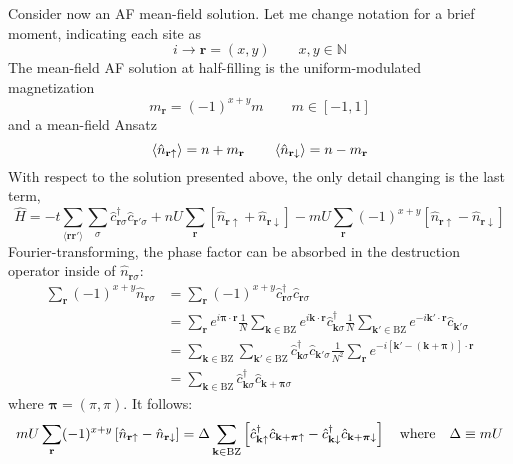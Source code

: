 Consider now an AF mean-field solution. Let me change notation for a brief moment, indicating each site as
\[
	i \to \mathbf{r} = (x,y)
	\qquad
	x,y \in \mathbb{N}
\]
The mean-field AF solution at half-filling is the uniform-modulated magnetization
\[
	m_\mathbf{r} = (-1)^{x+y} m
	\qquad
	m \in [-1,1]
\]
and a mean-field Ansatz
\[
	\ev{\hat n_{\mathbf{r}\uparrow}} = n+m_\mathbf{r}
	\qquad
	\ev{\hat n_{\mathbf{r}\downarrow}} = n-m_\mathbf{r}
\]
With respect to the solution presented above, the only detail changing is the last term,
\begin{equation}\label{appeq:hubbard-mean-field-hamiltonian}
	\hat H = -t \sum_{\langle \mathbf{r}\mathbf{r}' \rangle} \sum_\sigma \hat c_{\mathbf{r}\sigma}^\dagger \hat c_{\mathbf{r}'\sigma}
	+ nU \sum_\mathbf{r} \left[
		\hat n_{\mathbf{r}\uparrow} + \hat n_{\mathbf{r}\downarrow}
	\right] - mU \sum_\mathbf{r} (-1)^{x+y} \left[
		\hat n_{\mathbf{r}\uparrow} - \hat n_{\mathbf{r}\downarrow}
	\right]
\end{equation}
Fourier-transforming, the phase factor can be absorbed in the destruction operator inside of $\hat n_{\mathbf{r}\sigma}$:
\[
\begin{aligned}
	\sum_\mathbf{r} (-1)^{x+y} \hat n_{\mathbf{r}\sigma} &= \sum_\mathbf{r} (-1)^{x+y} \hat c_{\mathbf{r}\sigma}^\dagger \hat c_{\mathbf{r}\sigma} \\
	&= 
	\sum_\mathbf{r} e^{i \bm{\pi} \cdot \mathbf{r}}
	\frac{1}{N} \sum_{\mathbf{k} \in \mathrm{BZ}} e^{i \mathbf{k} \cdot \mathbf{r}} \hat c_{\mathbf{k}\sigma}^\dagger \frac{1}{N} \sum_{\mathbf{k}' \in \mathrm{BZ}} e^{-i \mathbf{k}' \cdot \mathbf{r}} \hat c_{\mathbf{k}'\sigma} \\
	&= \sum_{\mathbf{k} \in \mathrm{BZ}} \sum_{\mathbf{k}' \in \mathrm{BZ}} \hat c_{\mathbf{k}\sigma}^\dagger \hat c_{\mathbf{k}'\sigma} \frac{1}{N^2} \sum_\mathbf{r} e^{-i [\mathbf{k}' - (\mathbf{k} + \bm{\pi}) ] \cdot \mathbf{r}} \\
	&= \sum_{\mathbf{k} \in \mathrm{BZ}} \hat c_{\mathbf{k}\sigma}^\dagger \hat c_{\mathbf{k}+\bm{\pi}\sigma}
\end{aligned}
\]
where $\bm{\pi} = (\pi,\pi)$. It follows:
\[
mU \sum_\mathbf{r} (-1)^{x+y} \left[
		\hat n_{\mathbf{r}\uparrow} - \hat n_{\mathbf{r}\downarrow}
	\right] = \Delta \sum_{\mathbf{k} \in \mathrm{BZ}} \left[
		\hat c_{\mathbf{k}\uparrow}^\dagger \hat c_{\mathbf{k}+\bm{\pi}\uparrow} - \hat c_{\mathbf{k}\downarrow}^\dagger \hat c_{\mathbf{k}+\bm{\pi}\downarrow}
	\right]
	\qq{where}
	\Delta \equiv mU
\]

